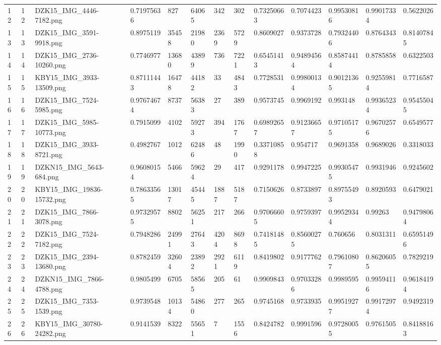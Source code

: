 \documentclass[11pt, a4paper, twoside]{report}
\begin{document}
\begin{longtable}[c]{@{}lllllllllllll@{}}
12 & 12 & DZK15\_IMG\_4446-7182.png & 0.71975636 & 827 & 64065 & 342 & 302 & 0.73250663 & 0.7074423 & 0.99530816 & 0.99017334 & 0.5622026 \\
13 & 13 & DZK15\_IMG\_3591-9918.png & 0.8975119 & 35458 & 21980 & 2369 & 5729 & 0.8609027 & 0.9373728 & 0.79324406 & 0.8764343 & 0.81407845 \\
14 & 14 & DZK15\_IMG\_2736-10260.png & 0.7746977 & 13680 & 43899 & 736 & 7221 & 0.65451413 & 0.94894564 & 0.85874414 & 0.8785858 & 0.6322503 \\
15 & 15 & KBY15\_IMG\_3933-13509.png & 0.87111443 & 16478 & 44182 & 33 & 4843 & 0.7728531 & 0.99800134 & 0.90121365 & 0.92559814 & 0.7716587 \\
16 & 16 & DZK15\_IMG\_7524-5985.png & 0.97674674 & 8737 & 56383 & 27 & 389 & 0.9573745 & 0.9969192 & 0.993148 & 0.99365234 & 0.95455045 \\
17 & 17 & DZK15\_IMG\_5985-10773.png & 0.7915099 & 4102 & 59273 & 394 & 1767 & 0.69892657 & 0.91236657 & 0.97105175 & 0.96702576 & 0.6549577 \\
18 & 18 & DZK15\_IMG\_3933-8721.png & 0.4982767 & 1012 & 62486 & 48 & 1990 & 0.33710858 & 0.954717 & 0.9691358 & 0.9689026 & 0.3318033 \\
19 & 19 & DZKN15\_IMG\_5643-684.png & 0.96080154 & 5466 & 59624 & 29 & 417 & 0.9291178 & 0.9947225 & 0.99305475 & 0.9931946 & 0.9245602 \\
20 & 20 & KBY15\_IMG\_19836-15732.png & 0.78633565 & 13017 & 45445 & 1887 & 5187 & 0.7150626 & 0.8733897 & 0.89755493 & 0.8920593 & 0.6479021 \\
21 & 21 & DZK15\_IMG\_7866-3078.png & 0.97329575 & 8802 & 56251 & 217 & 266 & 0.97066605 & 0.9759397 & 0.99529344 & 0.99263 & 0.94798064 \\
22 & 22 & DZK15\_IMG\_7524-7182.png & 0.7948286 & 24991 & 27643 & 4204 & 8698 & 0.74181485 & 0.85600275 & 0.760656 & 0.8031311 & 0.65951496 \\
23 & 23 & DZK15\_IMG\_2394-13680.png & 0.8782459 & 32604 & 23892 & 2921 & 6119 & 0.8419802 & 0.9177762 & 0.79610807 & 0.86206055 & 0.7829219 \\
24 & 24 & DZKN15\_IMG\_7866-4788.png & 0.9805499 & 6705 & 58565 & 205 & 61 & 0.9909843 & 0.97033286 & 0.9989595 & 0.99594116 & 0.96184194 \\
25 & 25 & DZK15\_IMG\_7353-1539.png & 0.9739548 & 10134 & 54860 & 277 & 265 & 0.9745168 & 0.9733935 & 0.99519277 & 0.99172974 & 0.9492319 \\
26 & 26 & KBY15\_IMG\_30780-24282.png & 0.9141539 & 8322 & 55651 & 7 & 1556 & 0.8424782 & 0.9991596 & 0.97280055 & 0.9761505 & 0.84188163 \\

\end{longtable}
\end{document}
